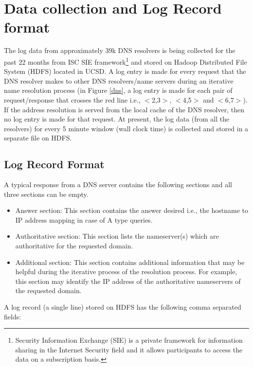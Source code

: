 \documentclass[11pt,a4paper]{article}
\newcommand{\resitem}[1]{\item #1 \vspace{-7pt}}
\begin{document}
\section {Data collection and Log Record format}
The log data from approximately 39k DNS resolvers is being collected for the past 22 months from ISC SIE framework\footnote{Security Information Exchange (SIE) is a private framework for information sharing in the Internet Security field and it allows participants to access the data on a subscription basis.}\cite{siedata} and stored on Hadoop Distributed File System (HDFS) located in UCSD. A log entry is made for every request that the DNS resolver makes to other DNS resolvers/name servers during an iterative name resolution process (in Figure \ref{dns}, a log entry is made for each pair of request/response that crosses the red line i.e., $<$2,3$>$, $<$4,5$>$ and $<$6,7$>$). If the address resolution is served from the local cache of the DNS resolver, then no log entry is made for that request. At present, the log data (from all the resolvers) for every 5 minute window (wall clock time) is collected and stored in a separate file on HDFS.

\subsection{Log Record Format}

A typical response from a DNS server contains the following sections and all three sections can be empty.
\begin{itemize}
	\resitem {Answer section: This section contains the answer desired i.e., the hostname to IP address mapping in case of A type queries.}
	\resitem {Authoritative section: This section lists the nameserver(s) which are authoritative for the requested domain.}
	\resitem {Additional section: This section contains additional information that may be helpful during the iterative process of the resolution process. For example, this section may identify the IP address of the authoritative nameservers of the requested domain.}
\end{itemize}
\noindent
A log record (a single line) stored on HDFS has the following comma separated fields:
\end{document}
